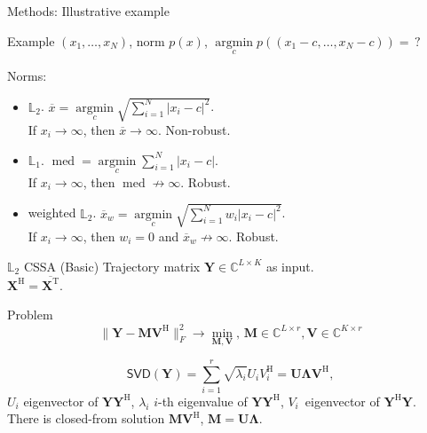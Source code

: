 \documentclass[ucs, notheorems, handout]{beamer}
\DeclareMathOperator{\med}{med}
\DeclareMathOperator*{\argmin}{argmin}
\newcommand{\tX}[1]{\mathsf{#1}}
\begin{document}
\begin{frame}{Methods: Illustrative example}
    \begin{block}{Example}
    $(x_1, \ldots, x_N)$, norm $p(x)$, $\argmin\limits_{c}p((x_1 - c, \ldots, x_N - c)) =\, ?$
    \end{block}
    Norms:
    \begin{itemize}
        \item $\mathbb{L}_2$. $\overline{x} = \argmin\limits_{c} \sqrt{\sum_{i = 1}^{N} |x_i - c|^2}$. \\
        If $x_i \to \infty$, then $\overline{x} \to \infty$. Non-robust.
        \item $\mathbb{L}_1$. $\med = \argmin\limits_{c} \sum_{i = 1}^{N} |x_i - c|$. \\
        If $x_i \to \infty$, then $\med \not\to \infty$. Robust.
        \item weighted $\mathbb{L}_2$. $\overline{x}_w = \argmin\limits_{c} \sqrt{\sum_{i = 1}^{N} w_i|x_i - c|^2}$.\\
        If $x_i \rightarrow \infty$, then $w_i = 0$ and $\overline{x}_w \not\to \infty$. Robust.
    \end{itemize}
\end{frame}

\begin{frame}{$\mathbb{L}_2$ CSSA (Basic)}
    Trajectory matrix $\mathbf{Y} \in \mathbb{C}^{L\times K}$ as input.\\
    \vspace{1em}
    $\mathbf{X}^{\mathrm{H}} = \overline{\mathbf{X}^{\mathrm{T}}}$.
    \begin{block}{Problem}
    \begin{equation*}
	    \|\mathbf{Y}-\mathbf{M}\mathbf{V}^{\mathrm{H}}\|_F^2 \longrightarrow \min_{\mathbf{M},\mathbf{V}}, \, \mathbf{M} \in \mathbb{C}^{L\times r}, \mathbf{V} \in \mathbb{C}^{K\times r}
    \end{equation*}
    \end{block}
    $$\tX{SVD}(\mathbf{Y}) = \sum_{i = 1}^{r} \sqrt{\lambda_i}U_i V_i^{\mathrm{H}} = \mathbf{U} \mathbf{\Lambda} \mathbf{V}^{\mathrm{H}},$$
    $U_i$ eigenvector of $\mathbf{Y} \mathbf{Y}^{\mathrm{H}}$, $\lambda_i$ $i$-th eigenvalue of $\mathbf{Y} \mathbf{Y}^{\mathrm{H}}$, $V_i$~eigenvector of $\mathbf{Y}^{\mathrm{H}} \mathbf{Y}$.\\
    \vspace{1em}
    There is closed-from solution $\mathbf{M}\mathbf{V}^{\mathrm{H}}$, $\mathbf{M} = \mathbf{U} \mathbf{\Lambda}$.

    \note{}
\end{frame}
\end{document}
